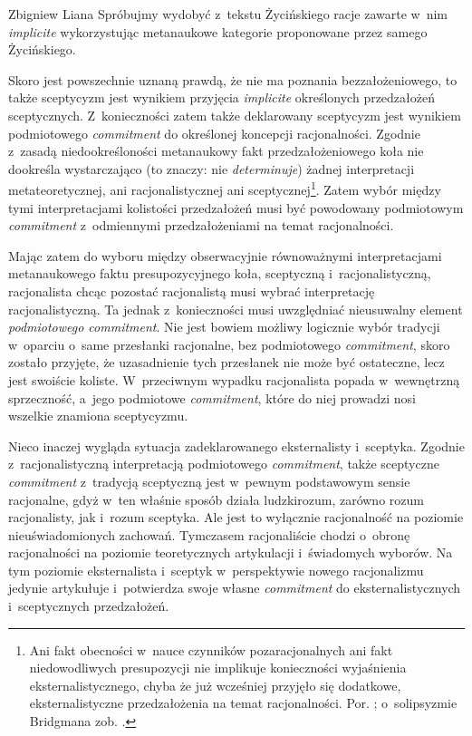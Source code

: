 \begin{artplenv}{Zbigniew Liana}
Spróbujmy wydobyć z~tekstu Życińskiego racje zawarte w~nim \textit{implicite} wykorzystując metanaukowe kategorie proponowane przez samego Życińskiego.

Skoro jest powszechnie uznaną prawdą, że nie ma poznania bezzałożeniowego, to także sceptycyzm jest wynikiem przyjęcia \textit{implicite} określonych przedzałożeń sceptycznych. Z~konieczności zatem także deklarowany sceptycyzm jest wynikiem podmiotowego \textit{commitment} do określonej koncepcji racjonalności. Zgodnie z~zasadą niedookreśloności metanaukowy fakt przedzałożeniowego koła nie dookreśla wystarczająco (to znaczy: nie \textit{determinuje}) żadnej interpretacji metateoretycznej, ani racjonalistycznej ani sceptycznej\footnote{Ani fakt obecności w~nauce czynników pozaracjonalnych ani fakt niedowodliwych presupozycji nie implikuje konieczności wyjaśnienia eksternalistycznego, chyba że już wcześniej przyjęło się dodatkowe, eksternalistyczne przedzałożenia na temat racjonalności. Por.
\parencites[][s.~184]{zycinski_elementy_1996}[][s.~250]{zycinski_elementy_2015}; %
 o~solipsyzmie Bridgmana zob. 
\parencites[][s.~186–188]{zycinski_elementy_1996}[][s.~253–255]{zycinski_elementy_2015}.%
}. Zatem wybór między tymi interpretacjami kolistości przedzałożeń musi być powodowany podmiotowym \textit{commitment} z~odmiennymi przedzałożeniami na temat racjonalności.

Mając zatem do wyboru między obserwacyjnie równoważnymi interpretacjami metanaukowego faktu presupozycyjnego koła, sceptyczną i~racjonalistyczną, racjonalista chcąc pozostać racjonalistą musi wybrać interpretację racjonalistyczną. Ta jednak z~konieczności musi uwzględniać nieusuwalny element \textit{podmiotowego commitment}. Nie jest bowiem możliwy logicznie wybór tradycji w~oparciu o~same przesłanki racjonalne, bez podmiotowego \textit{commitment}, skoro zostało przyjęte, że uzasadnienie tych przesłanek nie może być ostateczne, lecz jest swoiście koliste. W~przeciwnym wypadku racjonalista popada w~wewnętrzną sprzeczność, a~jego podmiotowe \textit{commitment}, które do niej prowadzi nosi wszelkie znamiona sceptycyzmu.

Nieco inaczej wygląda sytuacja zadeklarowanego eksternalisty i~sceptyka. Zgodnie z~racjonalistyczną interpretacją podmiotowego \textit{commitment}, także sceptyczne \textit{commitment} z~tradycją sceptyczną jest w~pewnym podstawowym sensie racjonalne, gdyż w~ten właśnie sposób działa ludzkirozum, zarówno rozum racjonalisty, jak i~rozum sceptyka. Ale jest to wyłącznie racjonalność na poziomie nieuświadomionych zachowań. Tymczasem racjonaliście chodzi o~obronę racjonalności na poziomie teoretycznych artykulacji i~świadomych wyborów. Na tym poziomie eksternalista i~sceptyk w~perspektywie nowego racjonalizmu jedynie artykułuje i~potwierdza swoje własne \textit{commitment} do eksternalistycznych i~sceptycznych przedzałożeń.


\end{artplenv}
